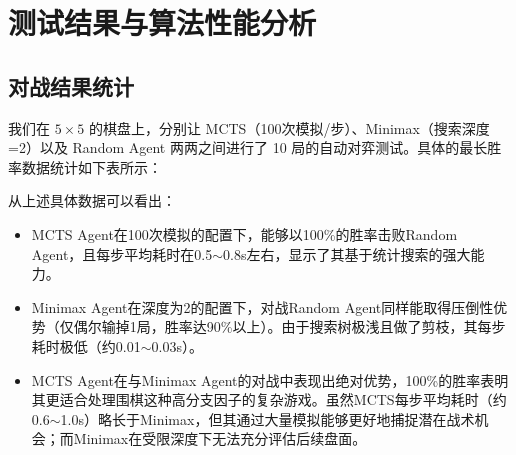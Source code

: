 \documentclass[12pt,a4paper]{ctexart}
\begin{document}
\section{测试结果与算法性能分析}
\subsection{对战结果统计}
我们在 $5\times 5$ 的棋盘上，分别让 MCTS（100次模拟/步）、Minimax（搜索深度=2）以及 Random Agent 两两之间进行了 10 局的自动对弈测试。具体的最长胜率数据统计如下表所示：

\begin{table}[H]
    \centering
    \caption{不同AI算法间的10局对战胜率与平均耗时统计}
\end{table}

从上述具体数据可以看出：
\begin{itemize}
    \item MCTS Agent在100次模拟的配置下，能够以100\%的胜率击败Random Agent，且每步平均耗时在0.5$\sim$0.8s左右，显示了其基于统计搜索的强大能力。
    \item Minimax Agent在深度为2的配置下，对战Random Agent同样能取得压倒性优势（仅偶尔输掉1局，胜率达90\%以上）。由于搜索树极浅且做了剪枝，其每步耗时极低（约0.01$\sim$0.03s）。
    \item MCTS Agent在与Minimax Agent的对战中表现出绝对优势，100\%的胜率表明其更适合处理围棋这种高分支因子的复杂游戏。虽然MCTS每步平均耗时（约0.6$\sim$1.0s）略长于Minimax，但其通过大量模拟能够更好地捕捉潜在战术机会；而Minimax在受限深度下无法充分评估后续盘面。
\end{itemize}
\end{document}
